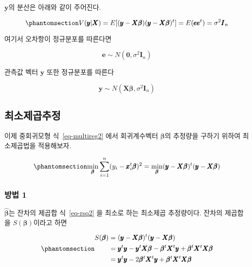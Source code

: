 \documentclass[
  11pt,
  a4paper,
  oneside]{scrbook}
\theoremstyle{definition}
\theoremstyle{plain}
\theoremstyle{definition}
\theoremstyle{definition}
\theoremstyle{remark}
\begin{document}
\(\pmb y\)의 분산은 아래와 같이 주어진다.

\begin{equation}\phantomsection\label{eq-multiregvar}{
 V( \pmb y| \pmb X) = E[( \pmb y -  \pmb X \pmb \beta)( \pmb y -  \pmb X \pmb \beta)^t] = E( \pmb  e   \pmb  e^t) = \sigma^2 \pmb I_n
}\end{equation}

여기서 오차항이 정규분포를 따른다면

\[ \pmb  e   \sim N(\pmb 0,\sigma^2 \pmb I_n) \]

관측값 벡터 \(\pmb y\) 또한 정규분포를 따른다

\[  \pmb y \sim N( \pmb X \pmb \beta, \sigma^2 \pmb I_n) \]

\subsection{최소제곱추정}\label{uxcd5cuxc18cuxc81cuxacf1uxcd94uxc815}

이제 중회귀모형 식~\ref{eq-multireg2} 에서 회귀계수벡터 \(\pmb \beta\)의
추정량을 구하기 위하여 최소제곱법을 적용해보자.

\begin{equation}\phantomsection\label{eq-rsq2}{
\min_{\pmb \beta} \sum_{i=1}^n (y_i -  \pmb x_i^t \pmb \beta )^2 = \min_{\pmb \beta } ( \pmb y -  \pmb X \pmb \beta )^t( \pmb y -  \pmb X \pmb \beta ) 
}\end{equation}

\subsubsection{방법 1}\label{uxbc29uxbc95-1}

\(\hat {\pmb \beta}\)는 잔차의 제곱합 식~\ref{eq-rsq2} 을 최소로 하는
최소제곱 추정량이다. 잔차의 제곱합을 \(S( \pmb \beta)\)이라고 하면

\begin{equation}\phantomsection\label{eq-rsq3}{
\begin{align} 
S( \pmb \beta ) & =  ( \pmb y -  \pmb X \pmb \beta)^t( \pmb y -  \pmb X \pmb \beta ) \notag \\
  & = \pmb y^t \pmb y - \pmb y^t \pmb X \pmb \beta - \pmb \beta^t \pmb X^t \pmb y
    + \pmb \beta^t \pmb X^t \pmb X \pmb \beta \notag \\
  & = \pmb y^t \pmb y -2  \pmb \beta^t \pmb X^t \pmb y
    + \pmb \beta^t \pmb X^t \pmb X \pmb \beta 
\end{align}
}\end{equation}
\end{document}
